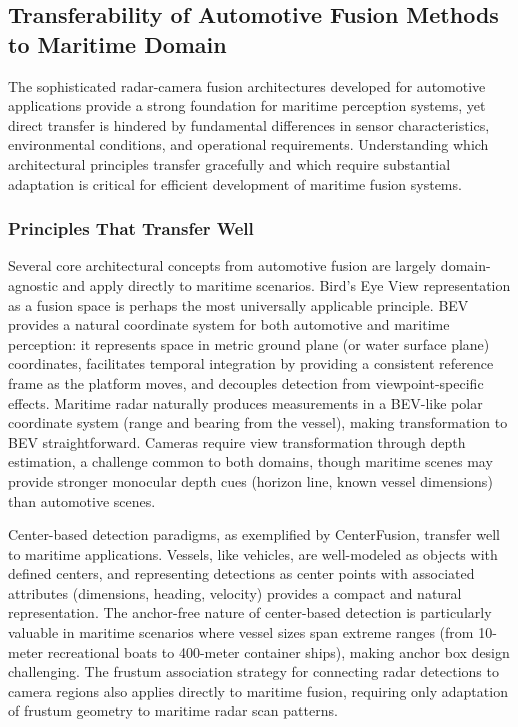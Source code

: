 

\subsection{Transferability of Automotive Fusion Methods to Maritime Domain}

The sophisticated radar-camera fusion architectures developed for automotive applications provide a strong foundation for maritime perception systems, yet direct transfer is hindered by fundamental differences in sensor characteristics, environmental conditions, and operational requirements. Understanding which architectural principles transfer gracefully and which require substantial adaptation is critical for efficient development of maritime fusion systems.

\subsubsection{Principles That Transfer Well}

Several core architectural concepts from automotive fusion are largely domain-agnostic and apply directly to maritime scenarios. Bird's Eye View representation as a fusion space is perhaps the most universally applicable principle. BEV provides a natural coordinate system for both automotive and maritime perception: it represents space in metric ground plane (or water surface plane) coordinates, facilitates temporal integration by providing a consistent reference frame as the platform moves, and decouples detection from viewpoint-specific effects. Maritime radar naturally produces measurements in a BEV-like polar coordinate system (range and bearing from the vessel), making transformation to BEV straightforward. Cameras require view transformation through depth estimation, a challenge common to both domains, though maritime scenes may provide stronger monocular depth cues (horizon line, known vessel dimensions) than automotive scenes.

Center-based detection paradigms, as exemplified by CenterFusion, transfer well to maritime applications. Vessels, like vehicles, are well-modeled as objects with defined centers, and representing detections as center points with associated attributes (dimensions, heading, velocity) provides a compact and natural representation. The anchor-free nature of center-based detection is particularly valuable in maritime scenarios where vessel sizes span extreme ranges (from 10-meter recreational boats to 400-meter container ships), making anchor box design challenging. The frustum association strategy for connecting radar detections to camera regions also applies directly to maritime fusion, requiring only adaptation of frustum geometry to maritime radar scan patterns.

